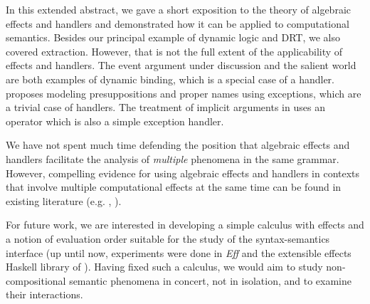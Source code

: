 \documentclass{article}
\begin{document}
In this extended abstract, we gave a short exposition to the theory of
algebraic effects and handlers and demonstrated how it can be applied to
computational semantics. Besides our principal example of dynamic logic and
DRT, we also covered extraction. However, that is not the full extent of the
applicability of effects and handlers. The event argument under discussion
\citep{qian2011event} and the salient world are both examples of dynamic
binding, which is a special case of a handler. \citet{lebedeva2012expression}
proposes modeling presuppositions and proper names using exceptions, which are
a trivial case of handlers. The treatment of implicit arguments in
\citet{blom2012implicit} uses an operator which is also a simple exception
handler.

We have not spent much time defending the position that algebraic effects and
handlers facilitate the analysis of \emph{multiple} phenomena in the same
grammar. However, compelling evidence for using algebraic effects and handlers
in contexts that involve multiple computational effects at the same time can
be found in existing literature (e.g. \citet{kiselyov2013extensible},
\citet{cartwright1994extensible}).

For future work, we are interested in developing a simple calculus with
effects and a notion of evaluation order suitable for the study of the
syntax-semantics interface (up until now, experiments were done in \emph{Eff}
\citep{bauer2012programming} and the extensible effects Haskell library of
\citet{kiselyov2013extensible}). Having fixed such a calculus, we would aim to
study non-compositional semantic phenomena in concert, not in isolation, and
to examine their interactions.




\end{document}
